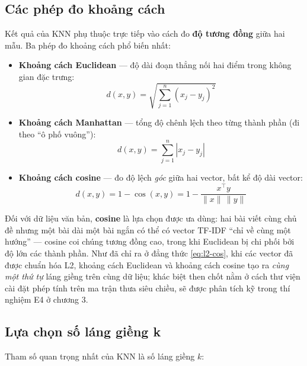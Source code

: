 \subsection{Các phép đo khoảng cách}
\label{sec:knn-khoang-cach}

Kết quả của KNN phụ thuộc trực tiếp vào cách đo \textbf{độ tương đồng} giữa hai mẫu. Ba phép đo khoảng cách phổ biến nhất:

\begin{itemize}
    \item \textbf{Khoảng cách Euclidean} --- độ dài đoạn thẳng nối hai điểm trong không gian đặc trưng:
    \begin{equation}
        d(x, y) = \sqrt{\sum_{j=1}^{n} \left(x_j - y_j\right)^2}
        \label{eq:euclid}
    \end{equation}
    \item \textbf{Khoảng cách Manhattan} --- tổng độ chênh lệch theo từng thành phần (đi theo ``ô phố vuông''):
    \begin{equation}
        d(x, y) = \sum_{j=1}^{n} \left| x_j - y_j \right|
        \label{eq:manhattan}
    \end{equation}
    \item \textbf{Khoảng cách cosine} --- đo độ lệch \textit{góc} giữa hai vector, bất kể độ dài vector:
    \begin{equation}
        d(x, y) = 1 - \cos(x, y) = 1 - \frac{x^{\top} y}{\lVert x \rVert \, \lVert y \rVert}
        \label{eq:cos}
    \end{equation}
\end{itemize}

Đối với dữ liệu văn bản, \textbf{cosine} là lựa chọn được ưa dùng: hai bài viết cùng chủ đề nhưng một bài dài một bài ngắn có thể có vector TF-IDF ``chỉ về cùng một hướng'' --- cosine coi chúng tương đồng cao, trong khi Euclidean bị chi phối bởi độ lớn các thành phần. Như đã chỉ ra ở đẳng thức \eqref{eq:l2-cos}, khi các vector đã được chuẩn hóa L2, khoảng cách Euclidean và khoảng cách cosine tạo ra \textit{cùng một thứ tự} láng giềng trên cùng dữ liệu; khác biệt then chốt nằm ở cách thư viện cài đặt phép tính trên ma trận thưa siêu chiều, sẽ được phân tích kỹ trong thí nghiệm E4 ở chương 3.

\subsection{Lựa chọn số láng giềng k}
\label{sec:knn-k}

Tham số quan trọng nhất của KNN là số láng giềng $k$:

